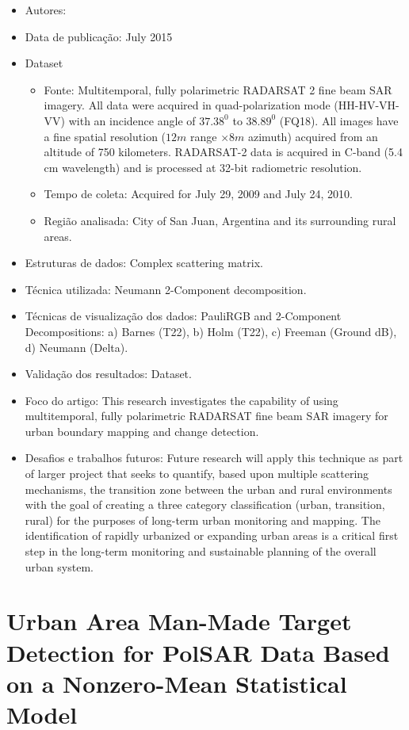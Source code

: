 \documentclass[paper=a4, fontsize=11pt]{scrartcl}
\begin{document}
\begin{itemize}
    \item Autores:~\cite{storie2012urban}
    \item Data de publicação: July 2015
    \item Dataset
    \begin{itemize}
        \item Fonte: Multitemporal, fully polarimetric RADARSAT 2 fine beam SAR imagery. All data were acquired in quad-polarization mode (HH-HV-VH-VV) with an incidence angle of $37.38^0$ to $38.89^0$ (FQ18). All images have a fine spatial resolution ($12m$ range $\times 8m$ azimuth) acquired from an altitude of 750 kilometers. RADARSAT-2 data is acquired in C-band (5.4 cm wavelength) and is processed at 32-bit radiometric resolution.
        \item Tempo de coleta: Acquired for July 29, 2009 and July 24, 2010.
        \item Região analisada: City of San Juan, Argentina and its surrounding rural areas.
    \end{itemize}
    \item Estruturas de dados: Complex scattering matrix.
    \item Técnica utilizada: Neumann 2-Component decomposition.
    \item Técnicas de visualização dos dados: PauliRGB and 2-Component Decompositions: a) Barnes (T22), b) Holm (T22), c) Freeman (Ground dB), d) Neumann (Delta).
    \item Validação dos resultados: Dataset.
    \item Foco do artigo: This research investigates the capability of using multitemporal, fully polarimetric RADARSAT fine beam SAR imagery for urban boundary mapping and change detection.
    \item Desafios e trabalhos futuros: Future research will apply this technique as part of larger project that seeks to quantify, based upon multiple scattering mechanisms, the transition zone between the urban and rural environments with the goal of creating a three category classification (urban, transition, rural) for the purposes of long-term urban monitoring and mapping. The identification of rapidly urbanized or expanding urban areas is a critical first step in the long-term monitoring and sustainable planning of the overall urban system.
\end{itemize}

\newpage

\section*{Urban Area Man-Made Target Detection for PolSAR Data Based on a Nonzero-Mean Statistical Model}
\end{document}
